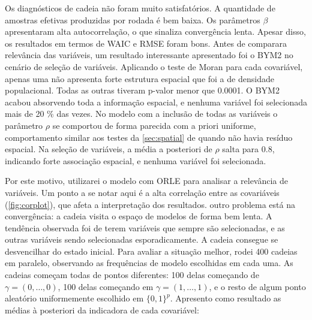 Os diagnósticos de cadeia não foram muito satisfatórios. A quantidade de amostras efetivas produzidas por rodada é bem baixa. Os parâmetros $\beta$ apresentaram alta autocorrelação, o que sinaliza convergência lenta. Apesar disso, os resultados em termos de WAIC e RMSE foram bons. Antes de comparara relevância das variáveis, um resultado interessante apresentado foi o BYM2 no cenário de seleção de variáveis. Aplicando o teste de Moran para cada covariável, apenas uma não apresenta forte estrutura espacial que foi a de densidade populacional. Todas as outras tiveram p-valor menor que 0.0001. O BYM2 acabou absorvendo toda a informação espacial, e nenhuma variável foi selecionada mais de 20 \% das vezes. No modelo com a inclusão de todas as variáveis o parâmetro $\rho$ se comportou de forma parecida com a priori uniforme, comportamento similar aos testes da \autoref{sec:spatial} de quando não havia resíduo espacial. Na seleção de variáveis, a média a posteriori de $\rho$ salta para 0.8, indicando forte associação espacial, e nenhuma variável foi selecionada. 

Por este motivo, utilizarei o modelo com ORLE para analisar a relevância de variáveis. Um ponto a se notar aqui é a alta correlação entre as covariáveis (\autoref{fig:corplot}), que afeta a interpretação dos resultados. outro problema está na convergência: a cadeia visita o espaço de modelos de forma bem lenta. A tendência observada foi de terem variáveis que sempre são selecionadas, e as outras variáveis sendo selecionadas esporadicamente. A cadeia consegue se desvencilhar do estado inicial. Para avaliar a situação melhor, rodei 400 cadeias em paralelo, observando as frequências de modelo escolhidas em cada uma. As cadeias começam todas de pontos diferentes: 100 delas começando de $\gamma = (0,\dots, 0)$, 100 delas começando em $\gamma = (1, \dots, 1)$, e o resto de algum ponto aleatório uniformemente escolhido em $\{0,1\}^p$. Apresento como resultado as médias à posteriori da indicadora de cada covariável:

